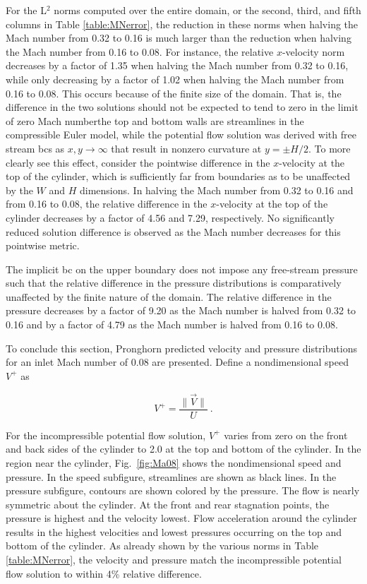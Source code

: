 For the L$^2$ norms computed over the entire domain, or the second, third, and fifth columns in Table \ref{table:MNerror}, the reduction in these norms when halving the Mach number from 0.32 to 0.16 is much larger than the reduction when halving the Mach number from 0.16 to 0.08. For instance, the relative \(x\)-velocity norm decreases by a factor of 1.35 when halving the Mach number from 0.32 to 0.16, while only decreasing by a factor of 1.02 when halving the Mach number from 0.16 to 0.08. This occurs because of the finite size of the domain. That is, the difference in the two solutions should not be expected to tend to zero in the limit of zero Mach number\mdash the top and bottom walls are streamlines in the compressible Euler model, while the potential flow solution was derived with free stream \glspl{bc} as \(x, y\rightarrow\infty\) that result in nonzero curvature at \(y=\pm H/2\). To more clearly see this effect, consider the pointwise difference in the $x$-velocity at the top of the cylinder, which is sufficiently far from boundaries as to be unaffected by the \(W\) and \(H\) dimensions. In halving the Mach number from 0.32 to 0.16 and from 0.16 to 0.08, the relative difference in the $x$-velocity at the top of the cylinder decreases by a factor of 4.56 and 7.29, respectively. No significantly reduced solution difference is observed as the Mach number decreases for this pointwise metric.

The implicit \gls{bc} on the upper boundary does not impose any free-stream pressure such that the relative difference in the pressure distributions is comparatively unaffected by the finite nature of the domain. The relative difference in the pressure decreases by a factor of 9.20 as the Mach number is halved from 0.32 to 0.16 and by a factor of 4.79 as the Mach number is halved from 0.16 to 0.08.

To conclude this section, Pronghorn predicted velocity and pressure distributions for an inlet Mach number of 0.08 are presented. Define a nondimensional speed \(V^+\) as

\begin{equation}
V^+=\frac{\|\vec{V}\|}{U}\ .
\end{equation}

\noindent For the incompressible potential flow solution, \(V^+\) varies from zero on the front and back sides of the cylinder to 2.0 at the top and bottom of the cylinder. In the region near the cylinder, Fig.\ \ref{fig:Ma08} shows the nondimensional speed and pressure. In the speed subfigure, streamlines are shown as black lines. In the pressure subfigure, contours are shown colored by the pressure. The flow is nearly symmetric about the cylinder. At the front and rear stagnation points, the pressure is highest and the velocity lowest. Flow acceleration around the cylinder results in the highest velocities and lowest pressures occurring on the top and bottom of the cylinder. As already shown by the various norms in Table \ref{table:MNerror}, the velocity and pressure match the incompressible potential flow solution to within 4\% relative difference.

